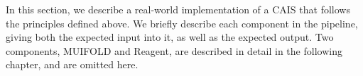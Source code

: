 In this section, we describe a real-world implementation of a CAIS that follows the principles
defined above. We briefly describe each component in the pipeline, giving both the expected
input into it, as well as the expected output. Two components, MUIFOLD and Reagent, are described
in detail in the following chapter, and are omitted here.
